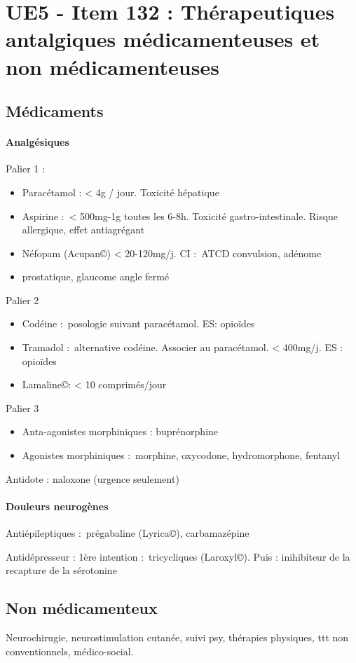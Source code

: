 \section{UE5 - Item 132 : Thérapeutiques antalgiques médicamenteuses et non
médicamenteuses}%
\label{sec:ue5_item_132}

\subsection{Médicaments}%

\paragraph{Analgésiques}%

Palier 1 :
\begin{itemize}
  \item Paracétamol : < 4g / jour. Toxicité hépatique
  \item Aspirine : < 500mg-1g toutes les 6-8h. Toxicité gastro-intestinale. Risque allergique, effet antiagrégant
  \item Néfopam (Acupan\copyright) < 20-120mg/j. CI : ATCD convulsion, adénome
  \item prostatique, glaucome angle fermé
\end{itemize}

Palier 2

\begin{itemize}
\item Codéine : posologie suivant paracétamol. ES: opioïdes
\item Tramadol : alternative codéine. Associer au paracétamol. < 400mg/j. ES : opioïdes
\item Lamaline\copyright : < 10 comprimés/jour
\end{itemize}

Palier 3
\begin{itemize}
  \item Anta-agonistes morphiniques : buprénorphine
  \item Agonistes morphiniques : morphine, oxycodone, hydromorphone, fentanyl
\end{itemize}

Antidote : naloxone (urgence seulement)

\paragraph{Douleurs neurogènes}%

Antiépileptiques : prégabaline (Lyrica\copyright), carbamazépine

Antidépresseur : 1ère intention : tricycliques (Laroxyl\copyright). Puis : inihibiteur de la recapture de la sérotonine


\subsection{Non médicamenteux}%
\label{sub:non_medicamenteux}

Neurochirugie, neurostimulation cutanée, suivi psy, thérapies physiques, ttt non
conventionnels, médico-social.

